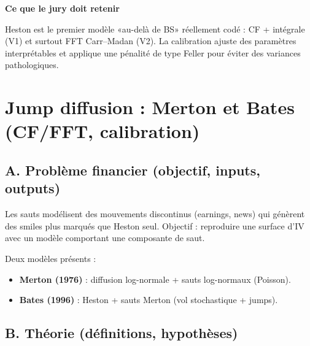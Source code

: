\documentclass[11pt,a4paper]{report}
\theoremstyle{definition}
\theoremstyle{plain}
\theoremstyle{remark}
\newcommand{\1}{\mathbf{1}}
\newcommand{\filepath}[1]{\texttt{\detokenize{#1}}}
\newcommand{\codeid}[1]{\texttt{\detokenize{#1}}}
\newcommand{\NonImplem}{\textbf{non implémenté dans le code actuel}}
\newenvironment{jurybox}{
\par\medskip
\begin{lrbox}{\juryboxbox}
\begin{minipage}{0.97\textwidth}
\textbf{Ce que le jury doit retenir}\par\smallskip
\ignorespaces
}{
\unskip\end{minipage}
\end{lrbox}
\noindent\fcolorbox{black!30}{black!3}{\usebox{\juryboxbox}}
\par\medskip
}
\begin{document}

\begin{jurybox}
Heston est le premier modèle «au-delà de BS» réellement codé : CF + intégrale (V1) et surtout FFT Carr--Madan (V2). La calibration ajuste des paramètres interprétables et applique une pénalité de type Feller pour éviter des variances pathologiques.
\end{jurybox}

\chapter{Jump diffusion : Merton et Bates (CF/FFT, calibration)}

\section{A. Problème financier (objectif, inputs, outputs)}
Les sauts modélisent des mouvements discontinus (earnings, news) qui génèrent des smiles plus marqués que Heston seul. Objectif : reproduire une surface d'IV avec un modèle comportant une composante de saut.

Deux modèles présents :
\begin{itemize}[leftmargin=*]
\item \textbf{Merton (1976)} : diffusion log-normale + sauts log-normaux (Poisson).
\item \textbf{Bates (1996)} : Heston + sauts Merton (vol stochastique + jumps).
\end{itemize}

\section{B. Théorie (définitions, hypothèses)}
\end{document}
